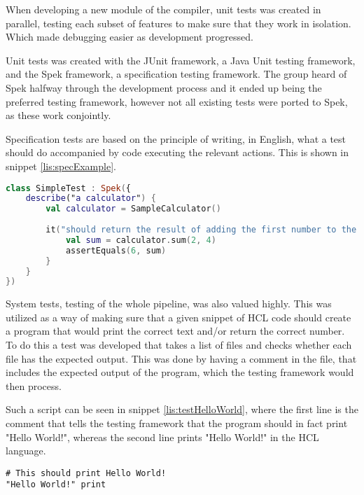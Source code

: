 When developing a new module of the compiler, unit tests was created in parallel, testing each subset of features to make sure that they work in isolation. 
Which made debugging easier as development progressed.

Unit tests was created with the JUnit\cite{JUnit} framework, a Java Unit testing framework, and the Spek\cite{SpekFramework} framework, a specification testing framework. 
The group heard of Spek halfway through the development process and it ended up being the preferred testing framework, however not all existing tests were ported to Spek, as these work conjointly.

Specification tests are based on the principle of writing, in English, what a test should do accompanied by code executing the relevant actions.
This is shown in snippet \ref{lis:specExample}.

\begin{lstlisting}[language=Kotlin,label={lis:specExample},caption={An sample unit tests with spec}]
class SimpleTest : Spek({
	describe("a calculator") {
		val calculator = SampleCalculator()
		
		it("should return the result of adding the first number to the second number") {
			val sum = calculator.sum(2, 4)
			assertEquals(6, sum)
		}
	}
})
\end{lstlisting}

System tests, testing of the whole pipeline, was also valued highly.
This was utilized as a way of making sure that a given snippet of HCL code should create a program that would print the correct text and/or return the correct number.
To do this a test was developed that takes a list of files and checks whether each file has the expected output.
This was done by having a comment in the file, that includes the expected output of the program, which the testing framework would then process. 

Such a script can be seen in snippet \ref{lis:testHelloWorld}, where the first line is the comment that tells the testing framework that the program should in fact print "Hello World!", whereas the second line prints "Hello World!" in the HCL language.
\begin{lstlisting}[language=HCL,label=lis:testHelloWorld,firstnumber=1,caption={A HCL test-script as part of the testing framework}]
# This should print Hello World!
"Hello World!" print
\end{lstlisting}

